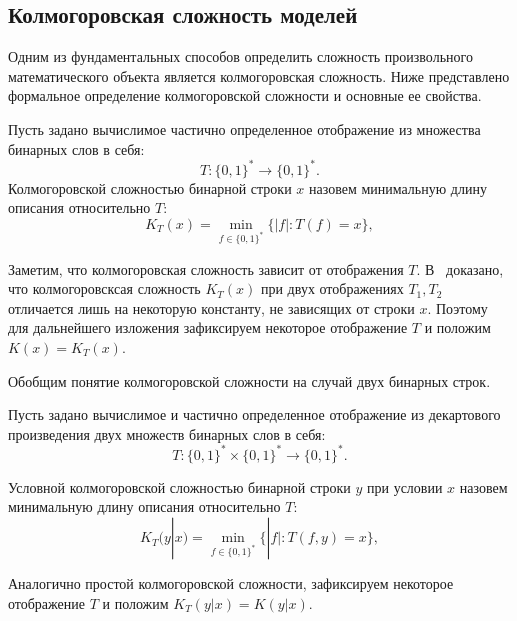 \documentclass[../main.tex]{subfiles}
\begin{document}
\subsection{Колмогоровская сложность моделей}

Одним из фундаментальных способов определить сложность произвольного математического объекта является колмогоровская сложность. Ниже представлено формальное определение колмогоровской сложности и основные ее свойства.


\begin{definition}
Пусть задано вычислимое частично определенное отображение из множества бинарных слов в себя:
\[
T: \{0,1\}^{*}  \to  \{0,1\}^{*}.
\]
Колмогоровской сложностью бинарной строки $x$ назовем минимальную длину описания относительно $T$:
\[
K_T(x) = \min_{f \in \{0,1\}^*}\{|f|: T(f) = x\},
\]
\end{definition}
Заметим, что колмогоровская сложность зависит от отображения $T$. В~\cite{kolmogorov} доказано, что колмогоровсксая сложность $K_T(x)$ при двух отображениях $T_1, T_2$ отличается лишь на некоторую константу, не зависящих от строки $x$. Поэтому для дальнейшего изложения зафиксируем некоторое отображение $T$ и положим $K(x) = K_T(x)$.


\begin{figure}
\centering
{}

\caption{}
\end{figure}


Обобщим понятие колмогоровской сложности на случай двух бинарных строк.

\begin{definition}
Пусть задано вычислимое и частично определенное отображение из декартового произведения двух множеств бинарных слов в себя:
\[
T: \{0,1\}^{*} \times  \{0,1\}^{*} \to  \{0,1\}^{*}.
\]

Условной колмогоровской сложностью бинарной строки $y$ при условии $x$ назовем минимальную длину описания относительно $T$:
\[
K_T(y|x) = \min_{f \in \{0,1\}^*}\{|f|: T(f, y) = x\},
\]
\end{definition}
Аналогично простой колмогоровской сложности, зафиксируем некоторое отображение $T$ и положим $K_T(y|x) = K(y|x)$.
\end{document}
